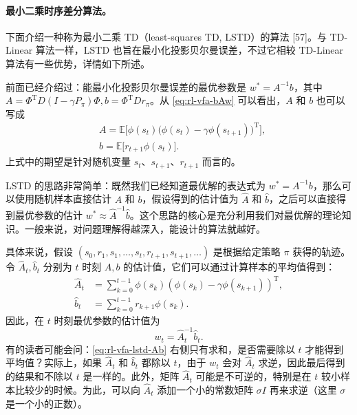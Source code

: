 \paragraph{最小二乘时序差分算法。}下面介绍一种称为最小二乘 TD（least-squares TD, LSTD）的算法 [57]。与 TD-Linear 算法一样，LSTD 也旨在最小化投影贝尔曼误差，不过它相较 TD-Linear 算法有一些优势，详情如下所述。

前面已经介绍过：能最小化投影贝尔曼误差的最优参数是 $w^{*} = A^{-1}b$，其中 $A = \Phi^{\mathrm{T}}D(I - \gamma P_{\pi})\Phi, b = \Phi^{\mathrm{T}}Dr_{\pi}$。从 \cref{eq:rl-vfa-bAw} 可以看出，$A$ 和 $b$ 也可以写成
\begin{equation*}
\begin{aligned}
& A = \mathbb{E}\Big[\phi(s_{t}) \big(\phi(s_{t}) - \gamma \phi(s_{t+1})\big)^{\mathrm{T}}\Big], \\
& b = \mathbb{E}\Big[r_{t+1} \phi(s_{t})\Big].
\end{aligned}
\end{equation*}
上式中的期望是针对随机变量 $s_t$、$s_{t+1}$、$r_{t+1}$ 而言的。

LSTD 的思路非常简单：既然我们已经知道最优解的表达式为 $w^{*} = A^{-1}b$，那么可以使用随机样本直接估计 $A$ 和 $b$，假设得到的估计值为 $\hat{A}$ 和 $\hat{b}$，之后可以直接得到最优参数的估计 $w^{*} \approx \hat{A}^{-1}\hat{b}$。这个思路的核心是充分利用我们对最优解的理论知识。一般来说，对问题理解得越深入，能设计的算法就越好。

具体来说，假设 $(s_0, r_1, s_1, \ldots, s_t, r_{t+1}, s_{t+1}, \ldots)$ 是根据给定策略 $\pi$ 获得的轨迹。令 $\hat{A}_t, \hat{b}_t$ 分别为 $t$ 时刻 $A, b$ 的估计值，它们可以通过计算样本的平均值得到：
\begin{equation}
\begin{aligned}
\hat{A}_{t} &= \sum_{k=0}^{t-1} \phi(s_{k}) (\phi(s_{k}) - \gamma \phi(s_{k+1}))^{\mathrm{T}}, \\
\hat{b}_{t} &= \sum_{k=0}^{t-1} r_{k+1} \phi(s_{k}).
\end{aligned}
\label{eq:rl-vfa-lstd-Ab}
\end{equation}
因此，在 $t$ 时刻最优参数的估计值为
\begin{equation*}
w_{t} = \hat{A}_{t}^{-1} \hat{b}_{t}.
\end{equation*}
有的读者可能会问：\cref{eq:rl-vfa-lstd-Ab} 右侧只有求和，是否需要除以 $t$ 才能得到平均值？实际上，如果 $\hat{A}_t$ 和 $\hat{b}_t$ 都除以 $t$，由于 $w_{t}$ 会对 $\hat{A}_t$ 求逆，因此最后得到的结果和不除以 $t$ 是一样的。此外，矩阵 $\hat{A}_t$ 可能是不可逆的，特别是在 $t$ 较小样本比较少的时候。为此，可以向 $\hat{A}_t$ 添加一个小的常数矩阵 $\sigma I$ 再来求逆（这里 $\sigma$ 是一个小的正数）。

